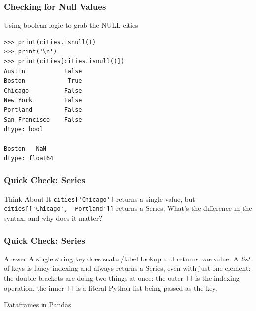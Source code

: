 \begin{frame}[fragile]\frametitle{Checking for Null Values}
Using boolean logic to grab the NULL cities
\begin{lstlisting}
>>> print(cities.isnull())
>>> print('\n')
>>> print(cities[cities.isnull()])
Austin           False
Boston            True
Chicago          False
New York         False
Portland         False
San Francisco    False
dtype: bool

Boston   NaN
dtype: float64
\end{lstlisting}
\end{frame}

\begin{frame}[fragile]\frametitle{Quick Check: Series}
\begin{block}{Think About It}
\lstinline{cities['Chicago']} returns a single value, but
\lstinline{cities[['Chicago', 'Portland']]} returns a Series. What's the difference in the
syntax, and why does it matter?
\end{block}
\end{frame}

\begin{frame}[fragile]\frametitle{Quick Check: Series}
\begin{block}{Answer}
A single string key does scalar/label lookup and returns \emph{one} value. A \emph{list} of
keys is fancy indexing and always returns a Series, even with just one element: the double
brackets are doing two things at once: the outer \lstinline{[]} is the indexing operation, the
inner \lstinline{[]} is a literal Python list being passed as the key.
\end{block}
\end{frame}

\begin{frame}
  \begin{center}
    {\Large Dataframes in Pandas}
  \end{center}
\end{frame}

